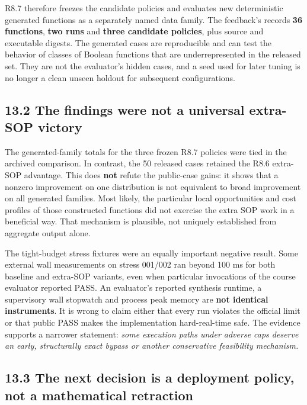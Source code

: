 \documentclass[a4paper,10pt]{article}
\theoremstyle{definition}
\theoremstyle{remark}
\begin{document}
R8.7 therefore freezes the candidate policies and evaluates new deterministic generated functions as a separately named data family. The feedback's  records \textbf{36 functions}, \textbf{two runs} and \textbf{three candidate policies}, plus source and executable digests. The generated cases are reproducible and can test the behavior of classes of Boolean functions that are underrepresented in the released set. They are not the evaluator's hidden cases, and a seed used for later tuning is no longer a clean unseen holdout for subsequent configurations.

\subsection{13.2 The findings were not a universal extra-SOP victory}\label{the-findings-were-not-a-universal-extra-sop-victory}

The generated-family totals for the three frozen R8.7 policies were tied in the archived comparison. In contrast, the 50 released cases retained the R8.6 extra-SOP advantage. This does \textbf{not} refute the public-case gains: it shows that a nonzero improvement on one distribution is not equivalent to broad improvement on all generated families. Most likely, the particular local opportunities and cost profiles of those constructed functions did not exercise the extra SOP work in a beneficial way. That mechanism is plausible, not uniquely established from aggregate output alone.

The tight-budget stress fixtures were an equally important negative result. Some external wall measurements on stress 001/002 ran beyond 100 ms for both baseline and extra-SOP variants, even when particular invocations of the course evaluator reported PASS. An evaluator's reported synthesis runtime, a supervisory wall stopwatch and process peak memory are \textbf{not identical instruments}. It is wrong to claim either that every run violates the official limit or that public PASS makes the implementation hard-real-time safe. The evidence supports a narrower statement: \emph{some execution paths under adverse caps deserve an early, structurally exact bypass or another conservative feasibility mechanism.}

\subsection{13.3 The next decision is a deployment policy, not a mathematical retraction}\label{the-next-decision-is-a-deployment-policy-not-a-mathematical-retraction}
\end{document}
